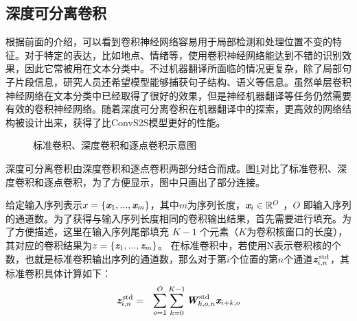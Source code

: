 \subsection{深度可分离卷积}
\label{sec:11.3.1}

\parinterval 根据前面的介绍，可以看到卷积神经网络容易用于局部检测和处理位置不变的特征。对于特定的表达，比如地点、情绪等，使用卷积神经网络能达到不错的识别效果，因此它常被用在文本分类中。不过机器翻译所面临的情况更复杂，除了局部句子片段信息，研究人员还希望模型能够捕获句子结构、语义等信息。虽然单层卷积神经网络在文本分类中已经取得了很好的效果，但是神经机器翻译等任务仍然需要有效的卷积神经网络。随着深度可分离卷积在机器翻译中的探索，更高效的网络结构被设计出来，获得了比ConvS2S模型更好的性能。

\begin{figure}[htp]
\centering

\caption{标准卷积、深度卷积和逐点卷积示意图}
\label{fig:11-17}
\end{figure}

\parinterval 深度可分离卷积由深度卷积和逐点卷积两部分结合而成。图\ref{fig:11-17}对比了标准卷积、深度卷积和逐点卷积，为了方便显示，图中只画出了部分连接。

\parinterval 给定输入序列表示${x} = \{ \textbf{\em x}_1,...,\textbf{\em x}_m \}$，其中$m$为序列长度，$\textbf{\em x}_i \in \mathbb{R}^{O} $ ，$O$ 即输入序列的通道数。为了获得与输入序列长度相同的卷积输出结果，首先需要进行填充。为了方便描述，这里在输入序列尾部填充 $K-1$ 个元素（$K$为卷积核窗口的长度），其对应的卷积结果为${z} = \{ \textbf{\em z}_1,...,\textbf{\em z}_m \}$。
在标准卷积中，若使用N表示卷积核的个数，也就是标准卷积输出序列的通道数，那么对于第$i$个位置的第$n$个通道$ \textbf{\em z}_{i,n}^\textrm{\,std}$，其标准卷积具体计算如下：
\begin{eqnarray}
\textbf{\em z}_{i,n}^\textrm{\,std} &=& \sum_{o=1}^{O} \sum_{k=0}^{K-1} \textbf{\em W}_{k,o,n}^\textrm{\,std} \textbf{\em x}_{i+k,o}
\label{eq:11-18}
\end{eqnarray}



